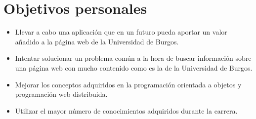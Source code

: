 \section{Objetivos personales}\label{objetivos-personales}

\begin{itemize}
\tightlist
\item
  Llevar a cabo una aplicación que en un futuro pueda aportar un valor añadido a la página web de la Universidad de Burgos.
\item
Intentar solucionar un problema común a la hora de buscar información sobre una página web con mucho contenido como es la de la Universidad de Burgos.
\item
Mejorar los conceptos adquiridos en la programación orientada a objetos y programación web distribuida.
\item
Utilizar el mayor número de conocimientos adquiridos durante la carrera.
\end{itemize}


